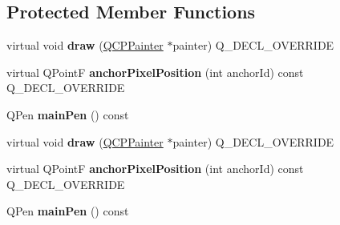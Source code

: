 \subsection*{Protected Member Functions}
\begin{DoxyCompactItemize}
\item 
virtual void {\bfseries draw} (\hyperlink{class_q_c_p_painter}{Q\+C\+P\+Painter} $\ast$painter) Q\+\_\+\+D\+E\+C\+L\+\_\+\+O\+V\+E\+R\+R\+I\+DE\hypertarget{class_q_c_p_item_bracket_a942a3978aea44a2fc7b4383f2bf6d417}{}\label{class_q_c_p_item_bracket_a942a3978aea44a2fc7b4383f2bf6d417}

\item 
virtual Q\+PointF {\bfseries anchor\+Pixel\+Position} (int anchor\+Id) const Q\+\_\+\+D\+E\+C\+L\+\_\+\+O\+V\+E\+R\+R\+I\+DE\hypertarget{class_q_c_p_item_bracket_a008d87325d26b6616d368cec06027cce}{}\label{class_q_c_p_item_bracket_a008d87325d26b6616d368cec06027cce}

\item 
Q\+Pen {\bfseries main\+Pen} () const \hypertarget{class_q_c_p_item_bracket_a8df4ad873bf88a4a7bfb9bbbd490e495}{}\label{class_q_c_p_item_bracket_a8df4ad873bf88a4a7bfb9bbbd490e495}

\item 
virtual void {\bfseries draw} (\hyperlink{class_q_c_p_painter}{Q\+C\+P\+Painter} $\ast$painter) Q\+\_\+\+D\+E\+C\+L\+\_\+\+O\+V\+E\+R\+R\+I\+DE\hypertarget{class_q_c_p_item_bracket_ab0bd7bc35c003158465163b6b14ee313}{}\label{class_q_c_p_item_bracket_ab0bd7bc35c003158465163b6b14ee313}

\item 
virtual Q\+PointF {\bfseries anchor\+Pixel\+Position} (int anchor\+Id) const Q\+\_\+\+D\+E\+C\+L\+\_\+\+O\+V\+E\+R\+R\+I\+DE\hypertarget{class_q_c_p_item_bracket_a941816bd018cff125cc6f8edefae1910}{}\label{class_q_c_p_item_bracket_a941816bd018cff125cc6f8edefae1910}

\item 
Q\+Pen {\bfseries main\+Pen} () const \hypertarget{class_q_c_p_item_bracket_a8df4ad873bf88a4a7bfb9bbbd490e495}{}\label{class_q_c_p_item_bracket_a8df4ad873bf88a4a7bfb9bbbd490e495}

\end{DoxyCompactItemize}
